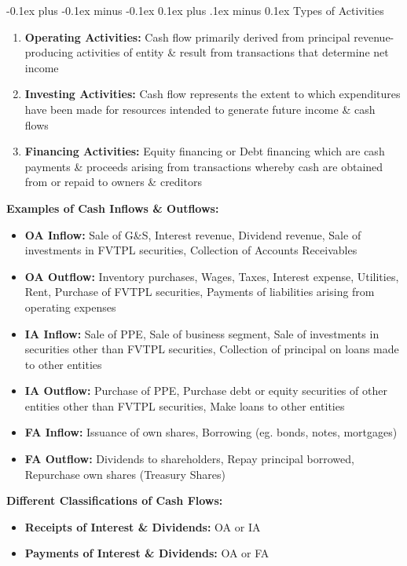 \documentclass[landscape]{article}
\makeatletter
\renewcommand{\subsection}{\@startsection{subsection}{2}{0mm}%
  {-0.1ex plus -0.1ex minus -0.1ex}%
  {0.1ex plus .1ex minus 0.1ex}%
{\normalfont\scriptsize\bfseries}}
\makeatother
\begin{document}
\begin{multicols}{6}
    \subsection{Types of Activities}
    \begin{enumerate}
      \item \textbf{Operating Activities:} Cash flow primarily derived from principal revenue-producing activities of entity \& result from transactions that determine net income
      \item \textbf{Investing Activities:} Cash flow represents the extent to which expenditures have been made for resources intended to generate future income \& cash flows
      \item \textbf{Financing Activities:} Equity financing or Debt financing which are cash payments \& proceeds arising from transactions whereby cash are obtained from or repaid to owners \& creditors
    \end{enumerate}
    \textbf{Examples of Cash Inflows \& Outflows:}
    \begin{itemize}
      \item \textbf{OA Inflow:} Sale of G\&S, Interest revenue, Dividend revenue, Sale of investments in FVTPL securities, Collection of Accounts Receivables
      \item \textbf{OA Outflow:} Inventory purchases, Wages, Taxes, Interest expense, Utilities, Rent, Purchase of FVTPL securities, Payments of liabilities arising from operating expenses
      \item \textbf{IA Inflow:} Sale of PPE, Sale of business segment, Sale of investments in securities other than FVTPL securities, Collection of principal on loans made to other entities
      \item \textbf{IA Outflow:} Purchase of PPE, Purchase debt or equity securities of other entities other than FVTPL securities, Make loans to other entities
      \item \textbf{FA Inflow:} Issuance of own shares, Borrowing (eg. bonds, notes, mortgages)
      \item \textbf{FA Outflow:} Dividends to shareholders, Repay principal borrowed, Repurchase own shares (Treasury Shares)
    \end{itemize}
    \textbf{Different Classifications of Cash Flows:}
    \begin{itemize}
      \item \textbf{Receipts of Interest \& Dividends:} OA or IA
      \item \textbf{Payments of Interest \& Dividends:} OA or FA
    \end{itemize}
    

\end{multicols}
\end{document}
